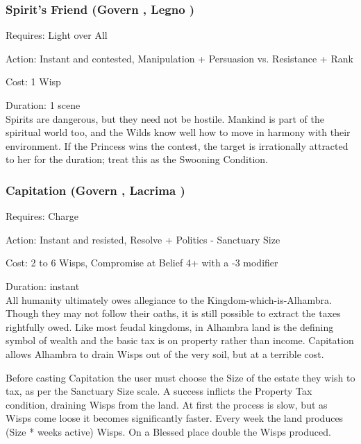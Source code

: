\subsubsection*{Spirit's Friend (Govern \textbullet\textbullet\textbullet, Legno \textbullet\textbullet)}

\noindent Requires: Light over All

\noindent Action: Instant and contested, Manipulation + Persuasion vs. Resistance + Rank

\noindent Cost: 1 Wisp

\noindent Duration: 1 scene \\

Spirits are dangerous, but they need not be hostile. Mankind is part of the spiritual world too, and the Wilds know well how to move in harmony with their environment. If the Princess wins the contest, the target is irrationally attracted to her for the duration; treat this as the Swooning Condition. 


\subsubsection*{Capitation (Govern \textbullet\textbullet\textbullet, Lacrima \textbullet\textbullet)}

\noindent Requires: Charge

\noindent Action: Instant and resisted, Resolve + Politics - Sanctuary Size

\noindent Cost: 2 to 6 Wisps, Compromise at Belief 4+ with a -3 modifier

\noindent Duration: instant \\

\noindent All humanity ultimately owes allegiance to the Kingdom-which-is-Alhambra. Though they may not follow their oaths, it is still possible to extract the taxes rightfully owed. Like most feudal kingdoms, in Alhambra land is the defining symbol of wealth and the basic tax is on property rather than income. Capitation allows Alhambra to drain Wisps out of the very soil, but at a terrible cost. 

Before casting Capitation the user must choose the Size of the estate they wish to tax, as per the Sanctuary Size scale. A success inflicts the Property Tax condition, draining Wisps from the land. At first the process is slow, but as Wisps come loose it becomes significantly faster. Every week the land produces (Size * weeks active) Wisps. On a Blessed place double the Wisps produced.

